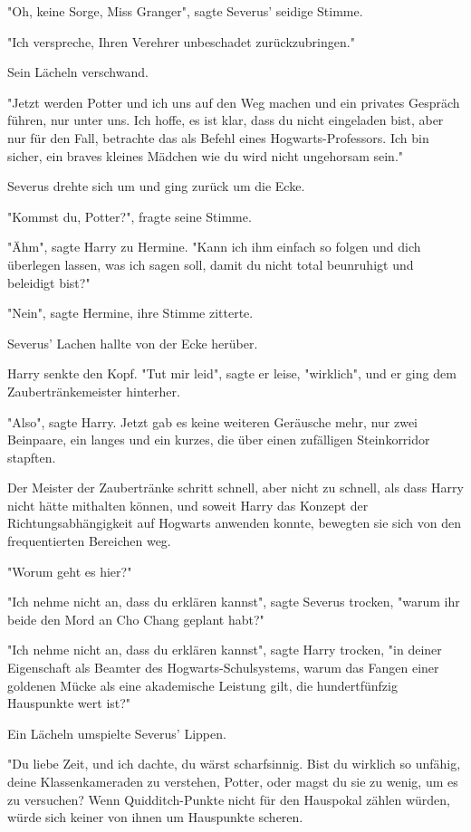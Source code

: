 {"Oh, keine Sorge, Miss Granger", sagte Severus' seidige Stimme.

"Ich verspreche, Ihren Verehrer unbeschadet zurückzubringen."

Sein Lächeln verschwand.

"Jetzt werden Potter und ich uns auf den Weg machen und ein privates Gespräch führen, nur unter uns. Ich hoffe, es ist klar, dass du nicht eingeladen bist, aber nur für den Fall, betrachte das als Befehl eines Hogwarts-Professors. Ich bin sicher, ein braves kleines Mädchen wie du wird nicht ungehorsam sein."

Severus drehte sich um und ging zurück um die Ecke.

"Kommst du, Potter?", fragte seine Stimme.

"Ähm", sagte Harry zu Hermine. "Kann ich ihm einfach so folgen und dich überlegen lassen, was ich sagen soll, damit du nicht total beunruhigt und beleidigt bist?"

"Nein", sagte Hermine, ihre Stimme zitterte.

Severus' Lachen hallte von der Ecke herüber.

Harry senkte den Kopf. "Tut mir leid", sagte er leise, "wirklich", und er ging dem Zaubertränkemeister hinterher.

"Also", sagte Harry. Jetzt gab es keine weiteren Geräusche mehr, nur zwei Beinpaare, ein langes und ein kurzes, die über einen zufälligen Steinkorridor stapften.

Der Meister der Zaubertränke schritt schnell, aber nicht zu schnell, als dass Harry nicht hätte mithalten können, und soweit Harry das Konzept der Richtungsabhängigkeit auf Hogwarts anwenden konnte, bewegten sie sich von den frequentierten Bereichen weg.

"Worum geht es hier?"

"Ich nehme nicht an, dass du erklären kannst", sagte Severus trocken, "warum ihr beide den Mord an Cho Chang geplant habt?"

"Ich nehme nicht an, dass du erklären kannst", sagte Harry trocken, "in deiner Eigenschaft als Beamter des Hogwarts-Schulsystems, warum das Fangen einer goldenen Mücke als eine akademische Leistung gilt, die hundertfünfzig Hauspunkte wert ist?"

Ein Lächeln umspielte Severus' Lippen.

"Du liebe Zeit, und ich dachte, du wärst scharfsinnig. Bist du wirklich so unfähig, deine Klassenkameraden zu verstehen, Potter, oder magst du sie zu wenig, um es zu versuchen? Wenn Quidditch-Punkte nicht für den Hauspokal zählen würden, würde sich keiner von ihnen um Hauspunkte scheren.

}
